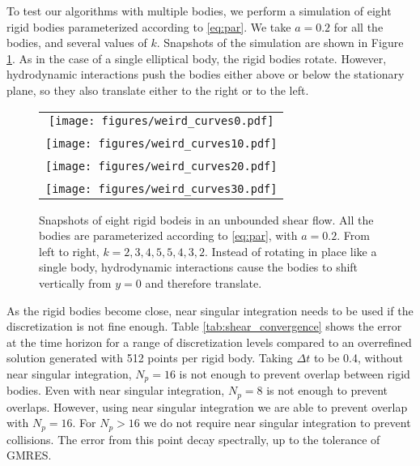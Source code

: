 To test our algorithms with multiple bodies, we perform a simulation of eight rigid bodies parameterized according to \eqref{eq:par}. We take $a=0.2$ for all the bodies, and several values of $k$. Snapshots of the simulation are shown in Figure \ref{fig:shear_snapshots}. As in the case of a single elliptical body, the rigid bodies rotate. However, hydrodynamic interactions push the bodies either above or below the stationary plane, so they also translate either to the right or to the left. 

\begin{figure}[!h]
\begin{center}
\begin{tabular}{c}
\texttt{[image: figures/weird\_curves0.pdf]}\\ \\
\texttt{[image: figures/weird\_curves10.pdf]}\\ \\
\texttt{[image: figures/weird\_curves20.pdf]}\\ \\
\texttt{[image: figures/weird\_curves30.pdf]}
\end{tabular}
\end{center}
\caption[Snapshots of fibers in a shear flow]{Snapshots of eight rigid bodeis in an unbounded shear flow. All the bodies are parameterized according to \eqref{eq:par}, with $a=0.2$. From left to right, $k = 2, 3, 4, 5, 5, 4, 3, 2$.  Instead of rotating in place like a single body, hydrodynamic interactions cause the bodies to shift vertically from $y=0$ and therefore translate.}\label{fig:shear_snapshots}
\end{figure}

As the rigid bodies become close, near singular integration needs to be used if the discretization is not fine enough. Table \ref{tab:shear_convergence} shows the error at the time horizon for a range of discretization levels compared to an overrefined solution generated with 512 points per rigid body. Taking $\Delta t$ to be 0.4, without near singular integration, $N_p = 16$ is not enough to prevent overlap between rigid bodies. Even with near singular integration, $N_p=8$ is not enough to prevent overlaps. However, using near singular integration we are able to prevent overlap with $N_p = 16$. For $N_p >16$ we do not require near singular integration to prevent collisions. The error from this point decay spectrally, up to the tolerance of GMRES.


